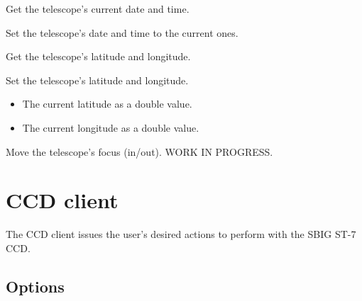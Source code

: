 \documentclass[a4paper,english]{article}
\begin{document}
\begin{Description}
	   
	
\item[\Arg{getdatetime}] Get the telescope's current date and time.

	   
	
\item[\Arg{setdatetime}] Set the telescope's date and time to the current ones.

	   
	
\item[\Arg{getlatlon}] Get the telescope's latitude and longitude.

	   
	
\item[\Arg{setlatlon}] Set the telescope's latitude and longitude.

	     
	
	\begin{itemize}
		\item {} The current latitude as a double value.
		\item {} The current longitude as a double value.
	\end{itemize}
	
\item[\Arg{focus}] Move the telescope's focus (in/out). WORK IN PROGRESS.
	
\end{Description}


\section{CCD client}

The CCD client issues the user's desired actions to perform with the SBIG ST-7 CCD. \\

     

     


\subsection{Options}
\end{document}
